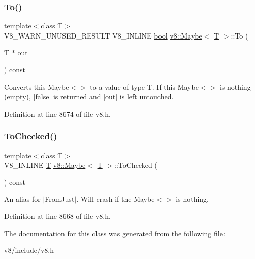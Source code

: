 \subsubsection{\texorpdfstring{To()}{To()}}
{\footnotesize\ttfamily template$<$class T$>$ \\
V8\+\_\+\+W\+A\+R\+N\+\_\+\+U\+N\+U\+S\+E\+D\+\_\+\+R\+E\+S\+U\+LT V8\+\_\+\+I\+N\+L\+I\+NE \mbox{\hyperlink{classbool}{bool}} \mbox{\hyperlink{classv8_1_1Maybe}{v8\+::\+Maybe}}$<$ \mbox{\hyperlink{classv8_1_1internal_1_1torque_1_1T}{T}} $>$\+::To (\begin{DoxyParamCaption}\item[{\mbox{\hyperlink{classv8_1_1internal_1_1torque_1_1T}{T}} $\ast$}]{out }\end{DoxyParamCaption}) const\hspace{0.3cm}{\ttfamily [inline]}}

Converts this Maybe$<$$>$ to a value of type T. If this Maybe$<$$>$ is nothing (empty), $\vert$false$\vert$ is returned and $\vert$out$\vert$ is left untouched. 

Definition at line 8674 of file v8.\+h.

\mbox{\label{classv8_1_1Maybe_abf2c0453c947f8c03f8e24b94887d33b}} 
\subsubsection{\texorpdfstring{To\+Checked()}{ToChecked()}}
{\footnotesize\ttfamily template$<$class T$>$ \\
V8\+\_\+\+I\+N\+L\+I\+NE \mbox{\hyperlink{classv8_1_1internal_1_1torque_1_1T}{T}} \mbox{\hyperlink{classv8_1_1Maybe}{v8\+::\+Maybe}}$<$ \mbox{\hyperlink{classv8_1_1internal_1_1torque_1_1T}{T}} $>$\+::To\+Checked (\begin{DoxyParamCaption}{ }\end{DoxyParamCaption}) const\hspace{0.3cm}{\ttfamily [inline]}}

An alias for $\vert$\+From\+Just$\vert$. Will crash if the Maybe$<$$>$ is nothing. 

Definition at line 8668 of file v8.\+h.



The documentation for this class was generated from the following file\+:\begin{DoxyCompactItemize}
\item 
v8/include/v8.\+h\end{DoxyCompactItemize}
